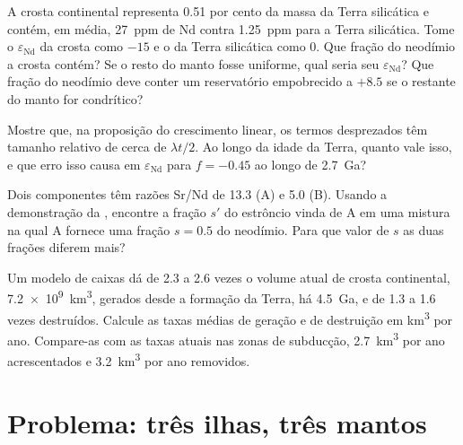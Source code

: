\begin{exercise}[$\star\star$]\label{exo:b2:isotope-geochemistry:9}
A crosta continental representa 0.51 por cento da massa da Terra silicática e contém,
em média, \qty{27}{ppm} de Nd contra \qty{1.25}{ppm} para a Terra silicática. Tome
o $\varepsilon_{\mathrm{Nd}}$ da crosta como $-15$ e o da Terra silicática como 0. Que
fração do neodímio a crosta contém? Se o resto do manto fosse uniforme,
qual seria seu $\varepsilon_{\mathrm{Nd}}$? Que fração do neodímio deve conter um
reservatório empobrecido a $+8.5$ se o restante do manto for condrítico?
\end{exercise}

\begin{exercise}[$\star\star\star$]\label{exo:b2:isotope-geochemistry:10}
Mostre que, na proposição do crescimento linear, os termos desprezados têm tamanho
relativo de cerca de $\lambda t/2$. Ao longo da idade da Terra, quanto vale isso, e que
erro isso causa em $\varepsilon_{\mathrm{Nd}}$ para $f = -0.45$ ao longo de
\qty{2.7}{Ga}?
\end{exercise}

\begin{exercise}[$\star\star\star$]\label{exo:b2:isotope-geochemistry:11}
Dois componentes têm razões Sr/Nd de 13.3 (A) e 5.0 (B). Usando a demonstração da
, encontre a fração $s'$ do estrôncio vinda de A em uma mistura na qual A
fornece uma fração $s = 0.5$ do neodímio. Para que valor de $s$ as duas
frações diferem mais?
\end{exercise}

\begin{exercise}[$\star\star\star$]\label{exo:b2:isotope-geochemistry:12}
Um modelo de caixas dá de 2.3 a 2.6 vezes o volume atual de crosta continental,
\qty{7.2e9}{km^3}, gerados desde a formação da Terra, há \qty{4.5}{Ga}, e de 1.3 a 1.6
vezes destruídos. Calcule as taxas médias de geração e de destruição em
\unit{km^3} por ano. Compare-as com as taxas atuais nas zonas de subducção,
\qty{2.7}{km^3} por ano acrescentados e \qty{3.2}{km^3} por ano removidos.
\end{exercise}

\section{Problema: três ilhas, três mantos}

